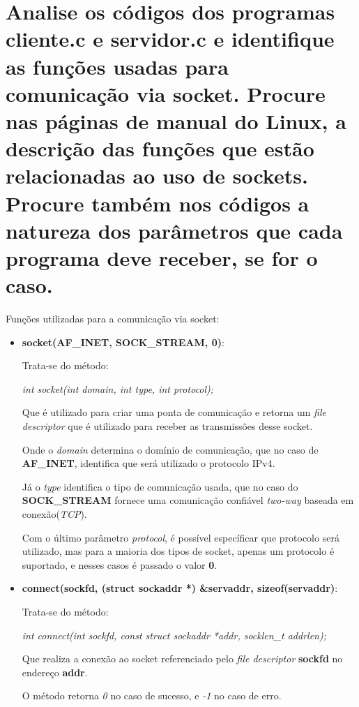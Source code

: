 \documentclass[12pt,a4paper]{report}
\begin{document}
\section{Analise os códigos dos programas cliente.c e servidor.c e identifique as funções usadas para
comunicação via socket. Procure nas páginas de manual do Linux, a descrição das funções que
estão relacionadas ao uso de sockets. Procure também nos códigos a natureza dos parâmetros
que cada programa deve receber, se for o caso.}

Funções utilizadas para a comunicação via socket:

\begin{itemize}
  \item \textbf{socket(AF\_INET, SOCK\_STREAM, 0)}: 
  
  Trata-se do método:

  \emph{ int socket(int domain, int type, int protocol);}

  Que é utilizado para criar uma ponta de comunicação e retorna um \emph{file descriptor} que é utilizado para receber as transmissões desse socket.

  \bigbreak

  Onde o \emph{domain} determina o domínio de comunicação, que no caso de \textbf{AF\_INET}, identifica que será utilizado o protocolo IPv4.
  
  \bigbreak

  Já o \emph{type} identifica o tipo de comunicação usada, que no caso do \textbf{SOCK\_STREAM} 
  fornece uma comunicação confiável \emph{two-way} baseada em conexão(\emph{TCP}).

  \bigbreak

  Com o último parâmetro \emph{protocol}, é possível específicar que protocolo será utilizado, mas para a maioria dos tipos de socket, apenas um protocolo é suportado, e nesses casos é passado o valor \textbf{0}.

  \item \textbf{connect(sockfd, (struct sockaddr *) \&servaddr, sizeof(servaddr)}: 
  
  Trata-se do método:

  \emph{int connect(int sockfd, const struct sockaddr *addr, socklen\_t addrlen);}

  Que realiza a conexão ao socket referenciado pelo \emph{file descriptor} \textbf{sockfd} no endereço \textbf{addr}.

  O método retorna \emph{0} no caso de sucesso, e \emph{-1} no caso de erro.


\end{itemize}
\end{document}
